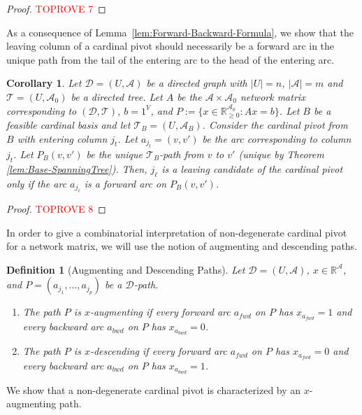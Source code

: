 \documentclass[11pt]{article}
\newcommand{\R}{\mathbb{R}}
\newtheorem{corollary}[theorem]{Corollary}
\newtheorem{definition}[theorem]{Definition}
\begin{document}
\begin{proof}\textcolor{red}{TOPROVE 7}\end{proof}

As a consequence of Lemma~\ref{lem:Forward-Backward-Formula}, we show that the leaving column of a cardinal pivot should necessarily be a forward arc in the unique path from the tail of the entering arc to the head of the entering arc. 
\begin{corollary}\label{lem:Leaving-Forward}
Let $\mathcal{D}=(U,\mathcal{A})$ be a directed graph with $|U|=n$, $|\mathcal{A}|=m$ and $\mathcal{T}=(U,\mathcal{A}_0)$ be a directed tree. Let $A$ be the $\mathcal{A}\times \mathcal{A}_0$ network matrix corresponding to $(\mathcal{D},\mathcal{T})$, $b=1^V$, and $P:=\{x\in \R^{\mathcal{A}_0}_{\ge 0}: Ax=b \}$. 
Let $B$ be a feasible cardinal basis and let $\mathcal{T}_B=(U,\mathcal{A}_B)$. 
Consider the cardinal pivot from $B$ with entering column $j_t$. Let $a_{j_t}=(v,v')$ be the arc corresponding to column $j_t$. Let $P_B(v,v')$ be the unique $\mathcal{T}_B$-path from $v$ to $v'$ (unique by Theorem \ref{lem:Base-SpanningTree}). Then, $j_\ell$ is a leaving candidate of the cardinal pivot only if the arc $a_{j_\ell}$ is a forward arc on $P_B(v,v')$.
\end{corollary}

\begin{proof}\textcolor{red}{TOPROVE 8}\end{proof}

In order to give a combinatorial interpretation of non-degenerate cardinal pivot for a network matrix, we will use the notion of augmenting and descending paths. 


\begin{definition}[Augmenting and Descending Paths]\label{def:x-alternating}
    Let $\mathcal{D}=(U,\mathcal{A})$, $x\in\mathbb{R}^\mathcal{A}$, and $P=(a_{j_1},\dots,a_{j_p})$ be a $\mathcal{D}$-path. 
    \begin{enumerate}
        \item The path $P$ is \emph{$x$-augmenting} if every forward arc $a_{fwd}$ on $P$ has $x_{a_{fwd}}=1$ and every backward arc $a_{bwd}$ on $P$ has $x_{a_{bwd}}=0$.
        \item The path $P$ is \emph{$x$-descending} if every forward arc $a_{fwd}$ on $P$ has $x_{a_{fwd}}=0$ and every backward arc $a_{bwd}$ on $P$ has $x_{a_{bwd}}=1$.
    \end{enumerate}
    
\end{definition}
We show that a non-degenerate cardinal pivot is characterized by an $x$-augmenting path.
\end{document}
